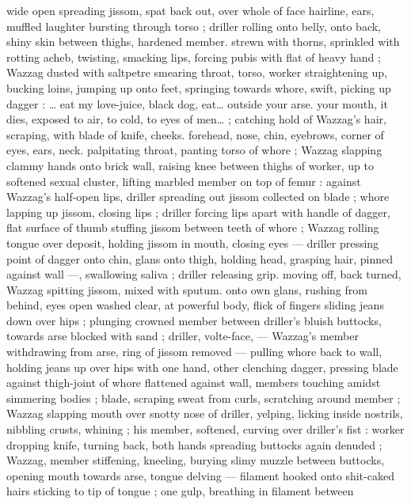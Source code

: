 wide open spreading jissom, spat back out, over whole of face 
hairline, ears, muffled laughter bursting through torso ; driller rolling 
onto belly, onto back, shiny skin between thighs, hardened member. 
strewn with thorns, sprinkled with rotting acheb, twisting, smacking 
lips, forcing pubis with flat of heavy hand ; Wazzag dusted with 
saltpetre smearing throat, torso, worker straightening up, bucking 
loins, jumping up onto feet, springing towards whore, swift, picking 
up dagger : {\gl}{\ldots} eat my love-juice, black dog, eat{\ldots} outside your arse. 
your mouth, it dies, exposed to air, to cold, to eyes of men{\ldots}{\gr} ; 
catching hold of Wazzag's hair, scraping, with blade of knife, cheeks. 
forehead, nose, chin, eyebrows, corner of eyes, ears, neck. 
palpitating throat, panting torso of whore ; Wazzag slapping clammy 
hands onto brick wall, raising knee between thighs of worker, up to 
softened sexual cluster, lifting marbled member on top of femur : 
against Wazzag's half-open lips, driller spreading out jissom 
collected on blade ; whore lapping up jissom, closing lips ; driller 
forcing lips apart with handle of dagger, flat surface of thumb 
stuffing jissom between teeth of whore ; Wazzag rolling tongue over 
deposit, holding jissom in mouth, closing eyes --- driller pressing 
point of dagger onto chin, glans onto thigh, holding head, grasping 
hair, pinned against wall ---, swallowing saliva ; driller releasing grip. 
moving off, back turned, Wazzag spitting jissom, mixed with sputum. 
onto own glans, rushing from behind, eyes open washed clear, at 
powerful body, flick of fingers sliding jeans down over hips ; plunging 
crowned member between driller's bluish buttocks, towards arse 
blocked with sand ; driller, volte-face, --- Wazzag's member 
withdrawing from arse, ring of jissom removed --- pulling whore back 
to wall, holding jeans up over hips with one hand, other clenching 
dagger, pressing blade against thigh-joint of whore flattened against 
wall, members touching amidst simmering bodies ; blade, scraping 
sweat from curls, scratching around member ; Wazzag slapping 
mouth over snotty nose of driller, yelping, licking inside nostrils, 
nibbling crusts, whining ; his member, softened, curving over driller's 
fist : worker dropping knife, turning back, both hands spreading 
buttocks again denuded ; Wazzag, member stiffening, kneeling, 
burying slimy muzzle between buttocks, opening mouth towards 
arse, tongue delving --- filament hooked onto shit-caked hairs 
sticking to tip of tongue ; one gulp, breathing in filament between 
